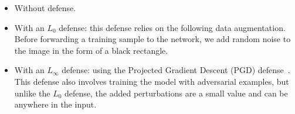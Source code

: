 \begin{itemize}
    \item Without defense. %
      \item With an $L_0$ defense: this defense relies on the following data augmentation.
    Before forwarding a training sample to the network, we add random noise to the image in the form of a black rectangle.
        \item With an $L_{\infty}$ defense: using the Projected Gradient Descent (PGD) defense~\cite{PGD}.
    This defense also involves training the model with adversarial examples, but unlike the $L_0$ defense, the added perturbations are a small value and can be anywhere in the input.
\end{itemize} 

